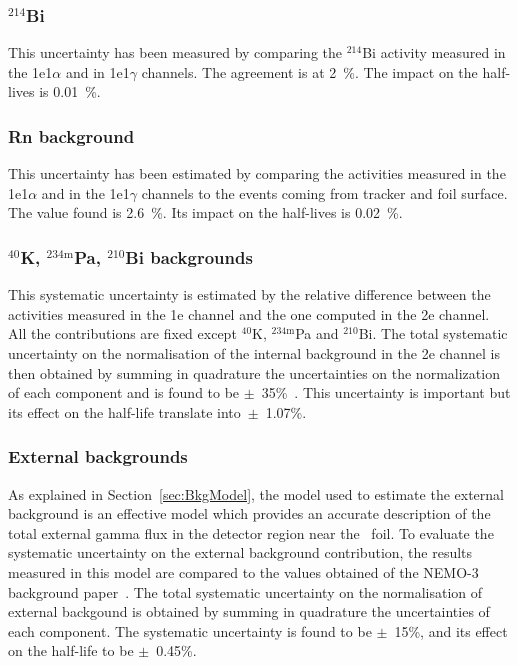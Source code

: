 \documentclass[main.tex]{subfiles}
\begin{document}
 
\subsubsection{$^{\text{214}}$Bi}


\NI This uncertainty has been measured by comparing the $^{\text{214}}$Bi activity measured in the 1e1$\alpha$ and in 1e1$\gamma$ channels. The agreement is at 2~\%. The impact on the half-lives is 0.01~\%.


\subsubsection{Rn background}


\NI This uncertainty has been estimated by comparing the activities measured in the 1e1$\alpha$ and in the 1e1$\gamma$ channels to the events coming from tracker and foil surface. The value found is 2.6~\%. Its impact on the half-lives is 0.02~\%.


\subsubsection{$^{\text{40}}$K, $^{\text{234m}}$Pa, $^{\text{210}}$Bi backgrounds}


\NI This systematic uncertainty is estimated by the relative difference between the activities measured in the 1e channel and the one computed in the 2e channel. All the contributions are fixed except $^{\text{40}}$K, $^{\text{234m}}$Pa and $^{\text{210}}$Bi. The total systematic uncertainty on the normalisation of the internal background in the 2e channel is then obtained by summing in quadrature the uncertainties on the normalization of each component and is found to be $\pm$~35\%~\cite{Arnold2016bed}. This uncertainty is important but its effect on the half-life translate into~$\pm$~1.07\%. 


\subsubsection{External backgrounds}



\NI As explained in Section~\ref{sec:BkgModel}, the model used to estimate the external background is an effective model which provides an accurate description of the total external gamma flux in the detector region near the \Cd~foil. To evaluate the systematic uncertainty on the external background contribution, the results measured in this model are compared to the values obtained of the NEMO-3 background paper~\cite{NEMO3-BKG}. The total systematic uncertainty on the normalisation of external backgound is obtained by summing in quadrature the uncertainties of each component. The systematic uncertainty is found to be $\pm$~15\%, and its effect on the half-life to be $\pm$~0.45\%. 
\end{document}
